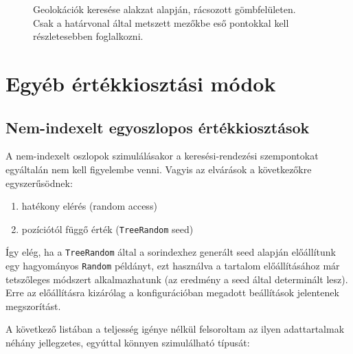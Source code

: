 \documentclass[
    parspace,
    noindent,
    nohyp,
]{elteiktdk}[2023/04/10]
\begin{document}
\begin{figure}[H]
\centering

\caption[Geolokációk keresése alakzat alapján]{
    Geolokációk keresése alakzat alapján, rácsozott gömbfelületen. \\
    Csak a határvonal által metszett mezőkbe eső pontokkal kell részletesebben foglalkozni.
}
\end{figure}


\section{Egyéb értékkiosztási módok}

\subsection{Nem-indexelt egyoszlopos értékkiosztások}

A nem-indexelt oszlopok szimulálásakor a keresési-rendezési szempontokat egyáltalán nem kell figyelembe venni.
Vagyis az elvárások a következőkre egyszerűsödnek:

\begin{enumerate}
    \item hatékony elérés (random access)
    \item pozíciótól függő érték (\texttt{TreeRandom} seed)
\end{enumerate}

Így elég, ha a \texttt{TreeRandom} által a sorindexhez generált seed alapján
előállítunk egy hagyományos \texttt{Random} példányt,
ezt használva a tartalom előállításához már tetszőleges módszert alkalmazhatunk
(az eredmény a seed által determinált lesz).
Erre az előállításra kizárólag a konfigurációban megadott beállítások jelentenek megszorítást.

A következő listában a teljesség igénye nélkül felsoroltam
az ilyen adattartalmak néhány jellegzetes,
egyúttal könnyen szimulálható típusát:
\end{document}

